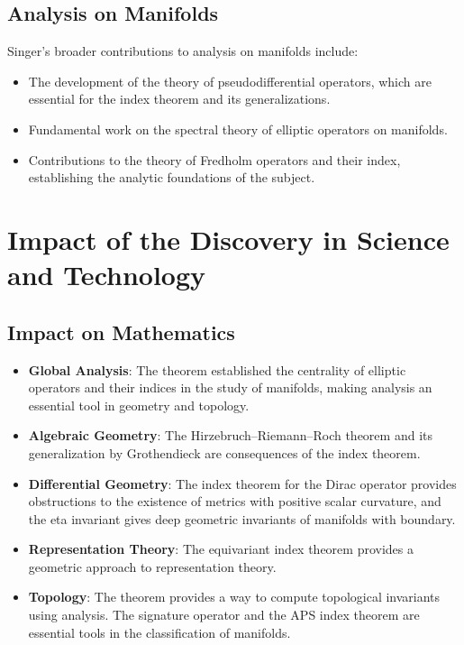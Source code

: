 \subsection{Analysis on Manifolds}

Singer's broader contributions to analysis on manifolds include:
\begin{itemize}
\item The development of the theory of pseudodifferential operators, which are essential for the index theorem and its generalizations.
\item Fundamental work on the spectral theory of elliptic operators on manifolds.
\item Contributions to the theory of Fredholm operators and their index, establishing the analytic foundations of the subject.
\end{itemize}

\section{Impact of the Discovery in Science and Technology}

\subsection{Impact on Mathematics}

\begin{itemize}
\item \textbf{Global Analysis}: The theorem established the centrality of elliptic operators and their indices in the study of manifolds, making analysis an essential tool in geometry and topology.

\item \textbf{Algebraic Geometry}: The Hirzebruch--Riemann--Roch theorem and its generalization by Grothendieck are consequences of the index theorem.

\item \textbf{Differential Geometry}: The index theorem for the Dirac operator provides obstructions to the existence of metrics with positive scalar curvature, and the eta invariant gives deep geometric invariants of manifolds with boundary.

\item \textbf{Representation Theory}: The equivariant index theorem provides a geometric approach to representation theory.

\item \textbf{Topology}: The theorem provides a way to compute topological invariants using analysis. The signature operator and the APS index theorem are essential tools in the classification of manifolds.
\end{itemize}

